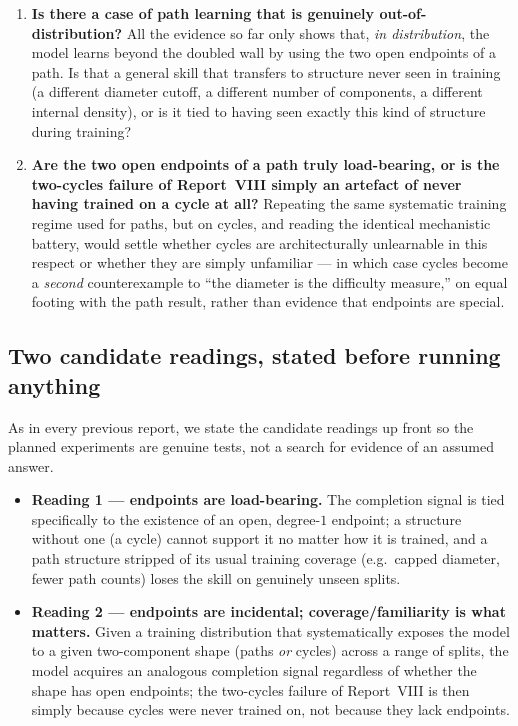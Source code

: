 \documentclass[11pt,a4paper]{article}
\begin{document}
\begin{enumerate}\setlength\itemsep{0.15em}
  \item \textbf{Is there a case of path learning that is genuinely out-of-distribution?} All
        the evidence so far only shows that, \emph{in distribution}, the model learns beyond
        the doubled wall by using the two open endpoints of a path. Is that a general skill
        that transfers to structure never seen in training (a different diameter cutoff, a
        different number of components, a different internal density), or is it tied to
        having seen exactly this kind of structure during training?
  \item \textbf{Are the two open endpoints of a path truly load-bearing, or is the two-cycles
        failure of Report~VIII simply an artefact of never having trained on a cycle at all?}
        Repeating the same systematic training regime used for paths, but on cycles, and
        reading the identical mechanistic battery, would settle whether cycles are
        architecturally unlearnable in this respect or whether they are simply unfamiliar ---
        in which case cycles become a \emph{second} counterexample to ``the diameter is the
        difficulty measure,'' on equal footing with the path result, rather than evidence that
        endpoints are special.
\end{enumerate}

\subsection{Two candidate readings, stated before running anything}
\label{sec:hypotheses}

As in every previous report, we state the candidate readings up front so the planned
experiments are genuine tests, not a search for evidence of an assumed answer.

\begin{itemize}\setlength\itemsep{0.15em}
  \item \textbf{Reading 1 --- endpoints are load-bearing.} The completion signal is tied
        specifically to the existence of an open, degree-$1$ endpoint; a structure without one
        (a cycle) cannot support it no matter how it is trained, and a path structure stripped
        of its usual training coverage (e.g.\ capped diameter, fewer path counts) loses the
        skill on genuinely unseen splits.
  \item \textbf{Reading 2 --- endpoints are incidental; coverage/familiarity is what matters.}
        Given a training distribution that systematically exposes the model to a given
        two-component shape (paths \emph{or} cycles) across a range of splits, the model
        acquires an analogous completion signal regardless of whether the shape has open
        endpoints; the two-cycles failure of Report~VIII is then simply because cycles were
        never trained on, not because they lack endpoints.
\end{itemize}
\end{document}
